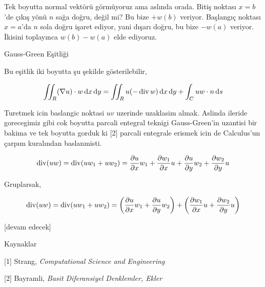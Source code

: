\documentclass[12pt,fleqn]{article}\usepackage{../../common}
\begin{document}
Tek boyutta normal vektörü görmüyoruz ama aslında orada. Bitiş noktası
$x=b$'de çıkış yönü $n$ sağa doğru, değil mi? Bu bize $+w(b)$ veriyor.
Başlangıç noktası $x=a$'da $n$ sola doğru işaret ediyor, yani dışarı doğru,
bu bize $-w(a)$ veriyor. İkisini toplayınca $w(b) - w(a)$ elde ediyoruz.

Gauss-Green Eşitliği

Bu eşitlik iki boyutta şu şekilde gösterilebilir,

$$
\iint_R (\nabla u ) \cdot w \,\mathrm{d} x \,\mathrm{d} y =
\iint_R u (- \operatorname{div} w) \,\mathrm{d} x \,\mathrm{d} y + \int_C u w \cdot n \,\mathrm{d} s
$$

Turetmek icin baslangic noktasi $uv$ uzerinde uzaklasim almak. Aslinda
ileride gorecegimiz gibi cok boyutta parcali entegral teknigi Gauss-Green'in
uzantisi bir bakima ve tek boyutta gorduk ki [2] parcali entegrale erismek
icin de Calculus'un çarpım kuralından baslanmisti.

$$
\operatorname{div} (uw) = \operatorname{div} (u w_1 + u w_2) =
\frac{\partial u}{\partial x} w_1 +
\frac{\partial w_1}{\partial x} u +
\frac{\partial u}{\partial y} w_2 +
\frac{\partial w_2}{\partial y} u 
$$

Gruplarsak,

$$
\operatorname{div} (uw) = \operatorname{div} (u w_1 + u w_2) =
\left( 
\frac{\partial u}{\partial x} w_1 +
\frac{\partial u}{\partial y} w_2 \right) +
\left( 
\frac{\partial w_1}{\partial x} u +
\frac{\partial w_2}{\partial y} u \right)
$$


[devam edecek]

Kaynaklar

[1] Strang, {\em Computational Science and Engineering}

[2] Bayramli, {\em Basit Diferansiyel Denklemler, Ekler}
\end{document}
